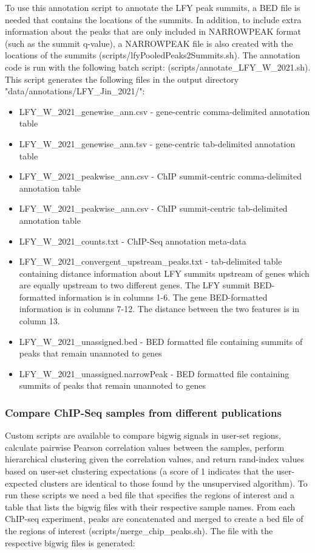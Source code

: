 \documentclass{article}
\begin{document}
\begin{sloppypar}
To use this annotation script to annotate the LFY peak summits, a BED file is needed that contains the locations of the summits. In addition, to include extra information about the peaks that are only included in NARROWPEAK format (such as the summit q-value), a NARROWPEAK file is also created with the locations of the summits ({\selectfont scripts/lfyPooledPeaks2Summits.sh}). The annotation code is run with the following batch script: (scripts/annotate\_LFY\_W\_2021.sh). This script generates the following files in the output directory "data/annotations/LFY\_Jin\_2021/":
\begin{itemize}
\item LFY\_W\_2021\_genewise\_ann.csv - gene-centric comma-delimited annotation table
\item LFY\_W\_2021\_genewise\_ann.tsv - gene-centric tab-delimited annotation table
\item LFY\_W\_2021\_peakwise\_ann.csv - ChIP summit-centric comma-delimited annotation table
\item LFY\_W\_2021\_peakwise\_ann.csv - ChIP summit-centric tab-delimited annotation table
\item  LFY\_W\_2021\_counts.txt - ChIP-Seq annotation meta-data
\item  LFY\_W\_2021\_convergent\_upstream\_peaks.txt - tab-delimited table containing distance information about LFY summits upstream of genes which are equally upstream to two different genes. The LFY summit BED-formatted information is in columns 1-6. The gene BED-formatted information is in columns 7-12. The distance between the two features is in column 13. 
\item  LFY\_W\_2021\_unassigned.bed - BED formatted file containing summits of peaks that remain unannoted to genes
\item  LFY\_W\_2021\_unassigned.narrowPeak - BED formatted file containing summits of peaks that remain unannoted to genes

\end{itemize}


\subsubsection{Compare ChIP-Seq samples from different publications}
Custom scripts are available to compare bigwig signals in user-set regions, calculate pairwise Pearson correlation values between the samples, perform hierarchical clustering given the correlation values, and return rand-index values based on user-set clustering expectations (a score of 1 indicates that the user-expected clusters are identical to those found by the unsupervised algorithm). To run these scripts we need a bed file that specifies the regions of interest and a table that lists the bigwig files with their respective sample names. From each ChIP-seq experiment, peaks are concatenated and merged to create a bed file of the regions of interest ({\selectfont scripts/merge\_chip\_peaks.sh}). The file with the respective bigwig files is generated:


\end{sloppypar}
\end{document}
